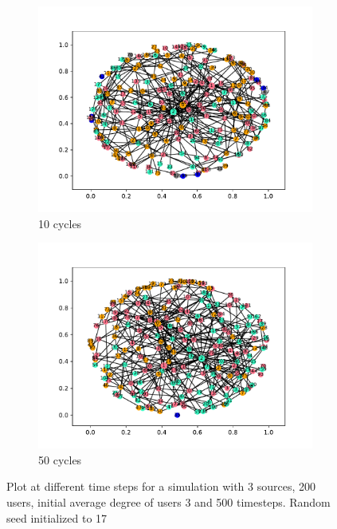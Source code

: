\begin{figure}[!h]
  \begin{subfigure}[t]{.45\textwidth}
    \centering
    \includegraphics[trim={1cm .5cm 1cm 1cm}, clip, width=\linewidth]{img/pdf/plot-0010.pdf} 
    \caption{10 cycles} \label{fig:300}
  \end{subfigure}
  \begin{subfigure}[t]{.45\textwidth}
    \centering
    \includegraphics[trim={1cm .5cm 1cm 1cm}, clip, width=\linewidth]{img/pdf/plot-0050.pdf} 
    \caption{50 cycles} \label{fig:400}
  \end{subfigure}
 
  \caption{Plot at different time steps for a simulation with 3 sources, 200 users, initial average degree of users 3 and 500 timesteps. Random seed initialized to 17}
\end{figure}

